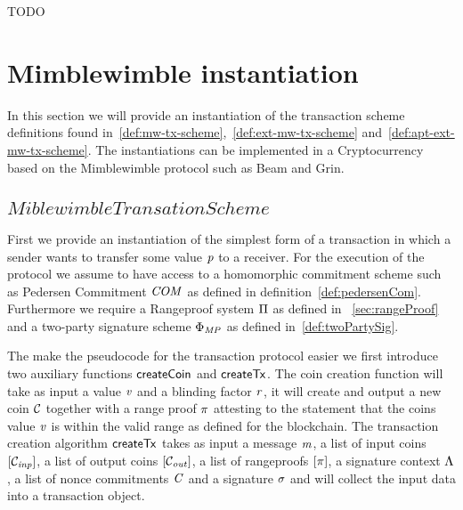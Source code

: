 \begin{definition}
    TODO
\end{definition}


\section{Mimblewimble instantiation}\label{sec:atomic-inst}

In this section we will provide an instantiation of the transaction scheme definitions found in~\ref{def:mw-tx-scheme},~\ref{def:ext-mw-tx-scheme} and~\ref{def:apt-ext-mw-tx-scheme}. The instantiations can be
implemented in a Cryptocurrency based on the Mimblewimble protocol such as Beam and Grin.

\subsection{$Miblewimble Transation Scheme$}

First we provide an instantiation of the simplest form of a transaction in which a sender wants to transfer some value $\mathit{p}$ to a receiver. For the execution of the protocol we assume to have access to a homomorphic
commitment scheme such as Pedersen Commitment $\mathit{COM}$ as defined in definition~\ref{def:pedersenCom}. Furthermore we require a Rangeproof system $\Pi$ as defined in
~\ref{sec:rangeProof} and a two-party signature scheme $\Phi_{\mathit{MP}}$ as defined in~\ref{def:twoPartySig}.

The make the pseudocode for the transaction protocol easier we first introduce two auxiliary functions $\mathsf{createCoin}$
and $\mathsf{createTx}$. The coin creation function will take as input a value $\mathit{v}$ and a blinding factor $\mathit{r}$, it will create and output a new coin $\mathcal{C}$ together with a range proof
$\pi$ attesting to the statement that the coins value $\mathit{v}$ is within the valid range as defined for the blockchain.
The transaction creation algorithm $\mathsf{createTx}$ takes as input a message $\mathit{m}$, a list of input coins $[\mathcal{C}_{\mathit{inp}}]$, a list of output coins $[\mathcal{C}_{\mathit{out}}]$, a list of rangeproofs
$[\pi]$, a signature context $\Lambda$, a list of nonce commitments $\mathit{C}$ and a signature $\sigma$ and will collect the input data into a transaction object.

